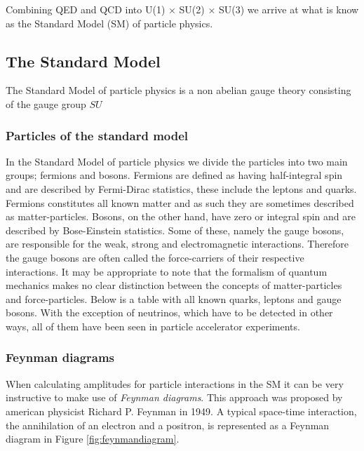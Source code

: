 Combining QED and QCD into U(1) $\times$ SU(2) $\times$ SU(3) we arrive at what is know as the Standard Model (SM) of particle physics.

\subsection{The Standard Model}
The Standard Model of particle physics is a non abelian gauge theory consisting of the gauge group $SU$

\subsubsection{Particles of the standard model}

In the Standard Model of particle physics we divide the particles into two main groups; fermions and bosons. Fermions are defined as having half-integral spin and are described by Fermi-Dirac statistics, these include the leptons and quarks. Fermions constitutes all known matter and as such they are sometimes described as matter-particles. Bosons, on the other hand, have zero or integral spin and are described by Bose-Einstein statistics. Some of these, namely the gauge bosons, are responsible for the weak, strong and electromagnetic interactions. Therefore the gauge bosons are often called the force-carriers of their respective interactions. It may be appropriate to note that the formalism of quantum mechanics makes no clear distinction between the concepts of matter-particles and force-particles. Below is a table with all known quarks, leptons and gauge bosons. With the exception of neutrinos, which have to be detected in other ways, all of them have been seen in particle accelerator experiments.


\subsubsection{Feynman diagrams}
When calculating amplitudes for particle interactions in the SM it can be very instructive to make use of \emph{Feynman diagrams}. This approach was proposed by american physicist Richard P. Feynman in 1949\cite{feynman1949sta}. A typical space-time interaction, the annihilation of an electron and a positron, is represented as a Feynman diagram in Figure \ref{fig:feynmandiagram}.

